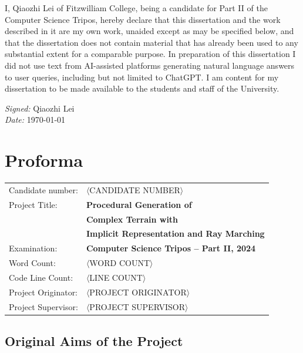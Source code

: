 \documentclass[12pt,a4paper,twoside,openright]{report}
\begin{document}
I, Qiaozhi Lei of Fitzwilliam College, being a candidate for Part II of the Computer Science Tripos, hereby declare that this dissertation and the work described in it are my own work, unaided except as may be specified below, and that the dissertation does not contain material that has already been used to any substantial extent for a comparable purpose. In preparation of this dissertation I did not use text from AI-assisted platforms generating natural language answers to user queries, including but not limited to ChatGPT. I am content for my dissertation to be made available to the students and staff of the University.

\emph{Signed:} Qiaozhi Lei\\
\emph{Date:} \today

\chapter*{Proforma}
 {\large
  \begin{tabular}{ll}
	  Candidate number:   & \(\langle\)CANDIDATE NUMBER\(\rangle\)                                        \\
	  Project Title:      & \bf Procedural Generation of 
   \\ & \bf Complex Terrain with 
   \\ & \bf Implicit Representation and Ray Marching       
   \\
	  Examination:        & \bf Computer Science Tripos -- Part II, 2024 \\
	  Word Count:         & \(\langle\)WORD COUNT\(\rangle\)\footnotemark[1]                        \\
	  Code Line Count:    & \(\langle\)LINE COUNT\(\rangle\)\footnotemark[2]                         \\
	  Project Originator: & \(\langle\)PROJECT ORIGINATOR\(\rangle\)         \\
	  Project Supervisor: & \(\langle\)PROJECT SUPERVISOR\(\rangle\)                 \\
  \end{tabular}
 }

\section*{Original Aims of the Project}
\end{document}
